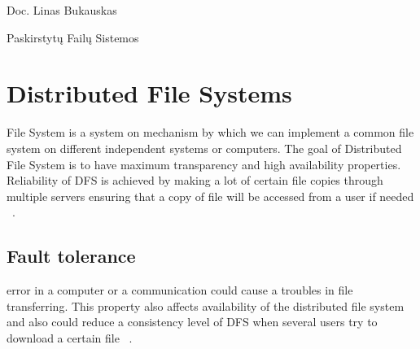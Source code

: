 \documentclass[a4paper,12pt,fleqn]{article}
\begin{document}
 {}{}{}{}%
 {Doc. Linas Bukauskas}

\tableofcontents

\bothabstracts{}%
{Paskirstytų Failų Sistemos} %
{}%






\section{Distributed File Systems}
 File System is a system on mechanism by which we can implement a common file system on different independent systems or computers. The goal of Distributed File System is to have maximum transparency and high availability properties. Reliability of DFS is achieved by making a lot of certain file copies through multiple servers ensuring that a copy of file will be accessed from a user if needed ~\cite{levy1990distributed}.


\subsection{Fault tolerance}
 error in a computer or a communication could cause a troubles in file transferring. This property also affects availability of the distributed file system and also could reduce a consistency level of DFS when several users try to download a certain file ~\cite{levy1990distributed}.
\end{document}
